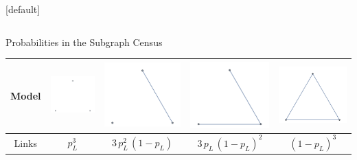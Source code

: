 \documentclass[final]{beamer}
\newlength{\onecolwid}
\newlength{\threecolwid}
\begin{document}
\begin{frame}[t]
\begin{columns}[t]
\begin{column}{\threecolwid}
\begin{columns}[t,totalwidth=\threecolwid]
\begin{column}{\onecolwid}
\begin{block}
\end{block}
[default]

\end{column} %

\end{columns} %

\begin{alertblock}{Probabilities in the Subgraph Census}

\begin{table}[b]
\def\arraystretch{1.5}
\setlength\tabcolsep{12mm}
\begin{center}
\begin{tabular}{c|c:c:c:c}
\textbf{Model}&\includegraphics[scale=1.5]{../Figure03_1.pdf}&\includegraphics[scale=1.5]{../Figure03_2.pdf}&\includegraphics[scale=1.5]{../Figure03_3.pdf}&\includegraphics[scale=1.5]{../Figure03_4.pdf}\\
\hline
Links & $p_{L}^{3}$ & $3 \, p_{L}^{2} \, (1-p_{L})$ & $3 \, p_{L} \, (1-p_{L})^{2}$ & $(1-p_{L})^{3}$ \\

\end{tabular}
\end{center}
\end{table}
\end{alertblock}
\end{column}
\end{columns}
\end{frame}
\end{document}
